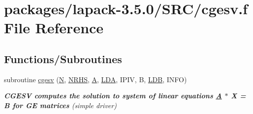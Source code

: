 \hypertarget{cgesv_8f}{}\section{packages/lapack-\/3.5.0/\+S\+R\+C/cgesv.f File Reference}
\label{cgesv_8f}
\subsection*{Functions/\+Subroutines}
\begin{DoxyCompactItemize}
\item 
subroutine \hyperlink{group__complexGEsolve_gaa9e9aeee4df582bfee679de7defb8e68}{cgesv} (\hyperlink{polmisc_8c_a0240ac851181b84ac374872dc5434ee4}{N}, \hyperlink{example__user_8c_aa0138da002ce2a90360df2f521eb3198}{N\+R\+H\+S}, \hyperlink{classA}{A}, \hyperlink{example__user_8c_ae946da542ce0db94dced19b2ecefd1aa}{L\+D\+A}, I\+P\+I\+V, B, \hyperlink{example__user_8c_a50e90a7104df172b5a89a06c47fcca04}{L\+D\+B}, I\+N\+F\+O)
\begin{DoxyCompactList}\small\item\em {\bfseries  C\+G\+E\+S\+V computes the solution to system of linear equations \hyperlink{classA}{A} $\ast$ X = B for G\+E matrices} (simple driver) \end{DoxyCompactList}\end{DoxyCompactItemize}
